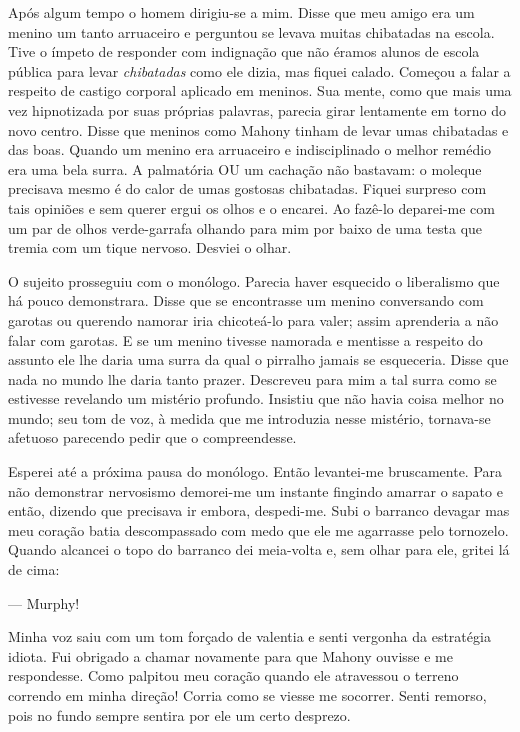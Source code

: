 Após algum tempo o homem dirigiu-se a mim. Disse que meu amigo era um
menino um tanto arruaceiro e perguntou se levava muitas chibatadas na
escola. Tive o ímpeto de responder com indignação que não éramos
alunos de escola pública para levar \textit{chibatadas} como ele dizia, mas
fiquei calado. Começou a falar a respeito de castigo corporal aplicado
em meninos. Sua mente, como que mais uma vez hipnotizada por suas
próprias palavras, parecia girar lentamente em torno do novo centro.
Disse que meninos como Mahony tinham de levar umas chibatadas e das
boas. Quando um menino era arruaceiro e indisciplinado o melhor
remédio era uma bela surra. A palmatória OU um cachação não bastavam:
o moleque precisava mesmo é do calor de umas gostosas chibatadas.
Fiquei surpreso com tais opiniões e sem
querer ergui os olhos e o encarei. Ao fazê-lo deparei-me com um
par de olhos verde-garrafa olhando para mim por baixo de uma testa que
tremia com um tique nervoso. Desviei o olhar.

O sujeito prosseguiu com o monólogo. Parecia haver esquecido o
liberalismo que há pouco demonstrara. Disse que se encontrasse um
menino conversando com garotas ou querendo namorar iria chicoteá-lo
para valer; assim aprenderia a não falar com garotas. E se um menino
tivesse namorada e mentisse a respeito do assunto ele lhe daria uma
surra da qual o pirralho jamais se esqueceria. Disse que nada no mundo
lhe daria tanto prazer. Descreveu para mim a tal surra como se
estivesse revelando um mistério profundo. Insistiu que não havia
coisa melhor no mundo; seu tom de voz, à medida que me introduzia
nesse mistério, tornava-se afetuoso parecendo pedir que o
compreendesse.

Esperei até a próxima pausa do monólogo. Então levantei-me
bruscamente. Para não demonstrar nervosismo demorei-me um instante
fingindo amarrar o sapato e então, dizendo que precisava ir embora,
despedi-me. Subi o barranco devagar mas meu coração batia
descompassado com medo que ele me agarrasse pelo tornozelo. Quando
alcancei o topo do barranco dei meia-volta e, sem olhar para ele,
gritei lá de cima:

--- Murphy!

Minha voz saiu com um tom forçado de valentia e senti vergonha da
estratégia idiota. Fui obrigado a chamar novamente para que Mahony
ouvisse e me respondesse. Como palpitou meu coração quando ele
atravessou o terreno correndo em minha direção! Corria como se viesse
me socorrer. Senti remorso, pois no fundo sempre sentira por ele um
certo desprezo.

